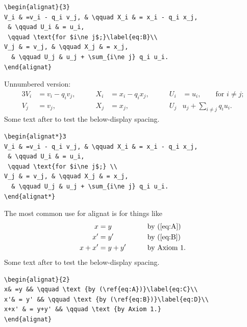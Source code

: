 \documentclass{article}
\newcommand{\ntt}{\normalfont\ttfamily}
\newcommand{\env}[1]{{\protect\ntt#1}}
\theoremstyle{definition}
\theoremstyle{remark}
\begin{document}
\begin{verbatim}
\begin{alignat}{3}
V_i & =v_i - q_i v_j, & \qquad X_i & = x_i - q_i x_j,
 & \qquad U_i & = u_i,
 \qquad \text{for $i\ne j$;}\label{eq:B}\\
V_j & = v_j, & \qquad X_j & = x_j,
  & \qquad U_j & u_j + \sum_{i\ne j} q_i u_i.
\end{alignat}
\end{verbatim}

Unnumbered version:
\begin{alignat*}3
V_i & =v_i - q_i v_j, & \qquad X_i & = x_i - q_i x_j,
 & \qquad U_i & = u_i,
 \qquad \text{for $i\ne j$;} \\
V_j & = v_j, & \qquad X_j & = x_j,
  & \qquad U_j & u_j + \sum_{i\ne j} q_i u_i.
\end{alignat*}
Some text after to test the below-display spacing.

\begin{verbatim}
\begin{alignat*}3
V_i & =v_i - q_i v_j, & \qquad X_i & = x_i - q_i x_j,
 & \qquad U_i & = u_i,
 \qquad \text{for $i\ne j$;} \\
V_j & = v_j, & \qquad X_j & = x_j,
  & \qquad U_j & u_j + \sum_{i\ne j} q_i u_i.
\end{alignat*}
\end{verbatim}

\newpage
The most common use for \env{alignat} is for things like
\begin{alignat}{2}
x& =y && \qquad \text {by (\ref{eq:A})}\label{eq:C}\\
x'& = y' && \qquad \text {by (\ref{eq:B})}\label{eq:D}\\
x+x' & = y+y' && \qquad \text {by Axiom 1.}
\end{alignat}
Some text after to test the below-display spacing.

\begin{verbatim}
\begin{alignat}{2}
x& =y && \qquad \text {by (\ref{eq:A})}\label{eq:C}\\
x'& = y' && \qquad \text {by (\ref{eq:B})}\label{eq:D}\\
x+x' & = y+y' && \qquad \text {by Axiom 1.}
\end{alignat}
\end{verbatim}

\newpage
\setlength{\marginrulewidth}{0pt}
\end{document}
